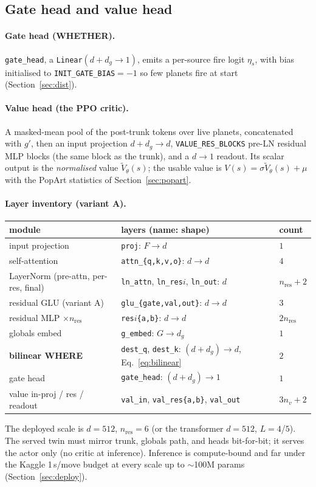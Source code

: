 \documentclass[11pt]{article}
\newcommand{\cd}[1]{\texttt{#1}}
\begin{document}
\subsection{Gate head and value head}
\paragraph{Gate head (WHETHER).} \cd{gate\_head}, a \cd{Linear}$(d{+}d_g\to1)$, emits a per-source fire
logit $\eta_s$, with bias initialised to \cd{INIT\_GATE\_BIAS}$=-1$ so few planets fire at start
(Section~\ref{sec:dist}).

\paragraph{Value head (the PPO critic).} A masked-mean pool of the post-trunk tokens over live planets,
concatenated with $g'$, then an input projection $d{+}d_g\to d$, \cd{VALUE\_RES\_BLOCKS} pre-LN residual
MLP blocks (the same block as the trunk), and a $d\to1$ readout. Its scalar output is the
\emph{normalised} value $\tilde V_\theta(s)$; the usable value is $V(s)=\sigma\tilde V_\theta(s)+\mu$
with the PopArt statistics of Section~\ref{sec:popart}.

\paragraph{Layer inventory (variant A).}
\begin{center}\small
\begin{tabular}{@{}lll@{}}
\toprule
module & layers (name: shape) & count \\
\midrule
input projection & \cd{proj}: $F{\to}d$ & $1$ \\
self-attention & \cd{attn\_\{q,k,v,o\}}: $d{\to}d$ & $4$ \\
LayerNorm (pre-attn, per-res, final) & \cd{ln\_attn}, \cd{ln\_res$i$}, \cd{ln\_out}: $d$ & $n_{\mathrm{res}}{+}2$ \\
residual GLU (variant A) & \cd{glu\_\{gate,val,out\}}: $d{\to}d$ & $3$ \\
residual MLP $\times n_{\mathrm{res}}$ & \cd{res$i$\{a,b\}}: $d{\to}d$ & $2n_{\mathrm{res}}$ \\
globals embed & \cd{g\_embed}: $G{\to}d_g$ & $1$ \\
\textbf{bilinear WHERE} & \cd{dest\_q}, \cd{dest\_k}: $(d{+}d_g){\to}d$, Eq.~\eqref{eq:bilinear} & $2$ \\
gate head & \cd{gate\_head}: $(d{+}d_g){\to}1$ & $1$ \\
value in-proj / res / readout & \cd{val\_in}, \cd{val\_res\{a,b\}}, \cd{val\_out} & $3n_v{+}2$ \\
\bottomrule
\end{tabular}
\end{center}
The deployed scale is $d{=}512$, $n_{\mathrm{res}}{=}6$ (or the transformer $d{=}512$, $L{=}4$/$5$). The
served twin must mirror trunk, globals path, and heads bit-for-bit; it serves the actor only (no critic
at inference). Inference is compute-bound and far under the Kaggle 1\,s/move budget at every scale up to
$\sim$100M params (Section~\ref{sec:deploy}).
\end{document}
